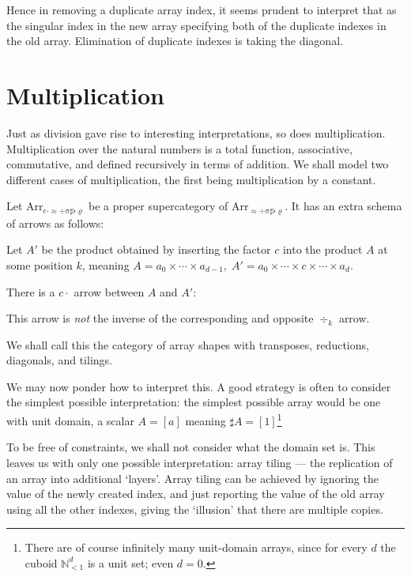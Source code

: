 \documentclass{DIKU-report-variant}
\newcommand\mrm[1]{\mathrm{#1}}
\newcommand\brm[1]{\bm{\mrm{#1}}}
\newcommand\Nat{\mathbb{N}}
\newcommand\Arr[1]{{\brm{Arr}_{\brm{#1}}}}
\newcommand\ADSSFR{\approx\div\sigma\sharp\flat\varrho}
\newcommand\CADSSFR{c\cdot\approx\div\sigma\sharp\flat\varrho}
\begin{document}
Hence in removing a duplicate array index, it seems prudent to interpret that as
the singular index in the new array specifying both of the duplicate indexes in the old array.
Elimination of duplicate indexes is taking the diagonal.

\section{Multiplication}

Just as division gave rise to interesting interpretations, so does multiplication.
Multiplication over the natural numbers is a total function, associative, commutative,
and defined recursively in terms of addition. We shall model two different cases of 
multiplication, the first being multiplication by a constant.

\begin{definition}
  \label{def:category-of-diagonals}
  Let \(\Arr\CADSSFR\) be a proper supercategory of \(\Arr\ADSSFR\).
  It has an extra schema of arrows as follows:

  Let \(A'\) be the product obtained by inserting the factor \(c\) into
  the product \(A\) at some position \(k\), meaning \(A = a_0 \times \cdots \times a_{d-1},\;
  A' = a_0\times\cdots\times c\times\cdots \times a_d\).

  There is a \(c\!\cdot\) arrow between \(A\) and \(A'\):
  \begin{center}
  \end{center}

  This arrow is \emph{not} the inverse of the corresponding and opposite \(\div_k\) arrow.

  We shall call this the category of array shapes with transposes, reductions,
  diagonals, and tilings.
\end{definition}

We may now ponder how to interpret this. A good strategy is often to consider the simplest
possible interpretation: the simplest possible array would be one with unit domain,
a scalar \(A = [a]\) meaning \(\sharp A = [1]\)\footnote{There are of course infinitely
many unit-domain arrays, since for every \(d\) the cuboid \(\Nat_{<1}^d\) is a unit set; even
\(d=0\).}

To be free of constraints, we shall not consider what the domain set is. This leaves us with
only one possible interpretation: array tiling --- the replication of an array into additional
`layers'. Array tiling can be achieved by ignoring the
value of the newly created index, and just reporting the value of the old array using all
the other indexes, giving the `illusion' that there are multiple copies.
\end{document}
